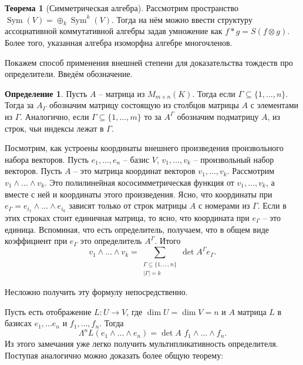 \documentclass[10pt,a4paper,oneside]{book}
\theoremstyle{definition}
\newtheorem*{defn}{\color{yellow!30!red} Определение}
\newtheorem{thm}{\color{red!40!black}Теорема}
\newcommand{\Sym}{\operatorname{Sym}}
\def\thrm{\begin{thm}}
\def\ethrm{\end{thm}}
\def\dfn{\begin{defn}}
\def\edfn{\end{defn}}
\begin{document}
\thrm[Симметрическая алгебра] Рассмотрим пространство $\Sym(V)=\oplus_k \Sym^k(V)$. Тогда на нём можно ввести структуру ассоциативной коммутативной алгебры задав умножение как $ f*g= S(f\otimes g)$. Более того, указанная алгебра изоморфна алгебре многочленов.
\ethrm




Покажем способ применения внешней степени для доказательства тождеств про определители. Введём обозначение.

\dfn Пусть $A$ -- матрица из $M_{m\times n}(K)$. Тогда если $\Gamma \subseteq \{1,\dots,n\}$. Тогда за $A_{\Gamma}$ обозначим матрицу состоящую из столбцов матрицы $A$ с элементами из $\Gamma$. Аналогично, если $\Gamma \subseteq \{1,\dots,m\}$ то за $A^{\Gamma}$ обозначим подматрицу $A$, из строк, чьи индексы лежат в $\Gamma$.
\edfn

Посмотрим, как устроены координаты внешнего произведения произвольного набора векторов. Пусть $e_1,\dots,e_n$ -- базис $V$, $v_1,\dots,v_k$ --  произвольный набор векторов. Пусть $A$ -- это матрица координат векторов $v_1,\dots,v_k$.
Рассмотрим $v_1 \wedge \dots \wedge v_k$. Это полилинейная кососимметрическая функция от $v_1,\dots,v_k$, а вместе с ней и координаты этого произведения. Ясно, что координаты при $e_{\Gamma}=e_{i_1}\wedge\dots\wedge e_{i_k}$ зависят только от строк матрицы $A$ с номерами из $\Gamma$. Если в этих строках стоит единичная матрица, то ясно, что координата при $e_{\Gamma}$ -- это единица. Вспоминая, что есть определитель, получаем, что в общем виде коэффициент при $e_{\Gamma}$ это определитель $A^{\Gamma}$. Итого 
$$v_1 \wedge \dots \wedge v_k= \sum_{\substack{\Gamma \subseteq \{1,\dots,n\}\\ |\Gamma|=k}} \det A^{\Gamma} e_{\Gamma}.$$

Несложно получить эту формулу непосредственно.

Пусть есть отображение $L \colon U \to V$, где $\dim U= \dim V = n$ и $A$ матрица $L$ в базисах $e_1,\dots e_n$ и $f_1,\dots,f_n$. Тогда $$\Lambda^n L(e_1\wedge \dots \wedge e_n) = \det A \,\,f_1 \wedge \dots \wedge f_n.$$
Из этого замечания уже легко получить мультипликативность определителя. Поступая аналогично можно доказать более общую теорему:
\end{document}
